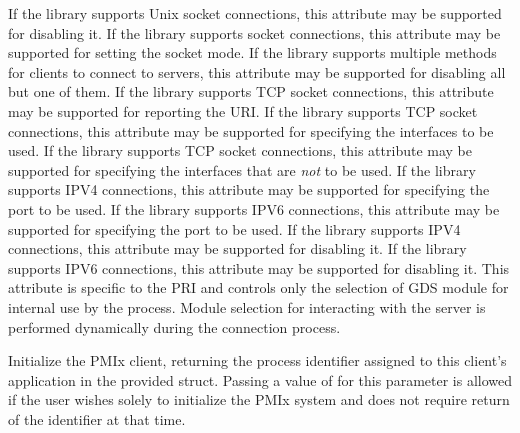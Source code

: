  If the library supports Unix socket connections, this attribute may be supported for disabling it.
\pasteAttributeItemEnd{}
 If the library supports socket connections, this attribute may be supported for setting the socket mode.
\pasteAttributeItemEnd{}
 If the library supports multiple methods for clients to connect to servers, this attribute may be supported for disabling all but one of them.
\pasteAttributeItemEnd{}
 If the library supports TCP socket connections, this attribute may be supported for reporting the URI.
\pasteAttributeItemEnd{}
 If the library supports TCP socket connections, this attribute may be supported for specifying the interfaces to be used.
\pasteAttributeItemEnd{}
 If the library supports TCP socket connections, this attribute may be supported for specifying the interfaces that are \textit{not} to be used.
\pasteAttributeItemEnd{}
 If the library supports IPV4 connections, this attribute may be supported for specifying the port to be used.
\pasteAttributeItemEnd{}
 If the library supports IPV6 connections, this attribute may be supported for specifying the port to be used.
\pasteAttributeItemEnd{}
 If the library supports IPV4 connections, this attribute may be supported for disabling it.
\pasteAttributeItemEnd{}
 If the library supports IPV6 connections, this attribute may be supported for disabling it.
\pasteAttributeItemEnd{}
 This attribute is specific to the \ac{PRI} and controls only the selection of \ac{GDS} module for internal use by the process. Module selection for interacting with the server is performed dynamically during the connection process.
\pastePRIAttributeItemEnd{}
\optattrend

\descr

Initialize the \ac{PMIx} client, returning the process identifier assigned to this client's application in the provided  struct.
Passing a value of  for this parameter is allowed if the user wishes solely to initialize the \ac{PMIx} system and does not require return of the identifier at that time.

